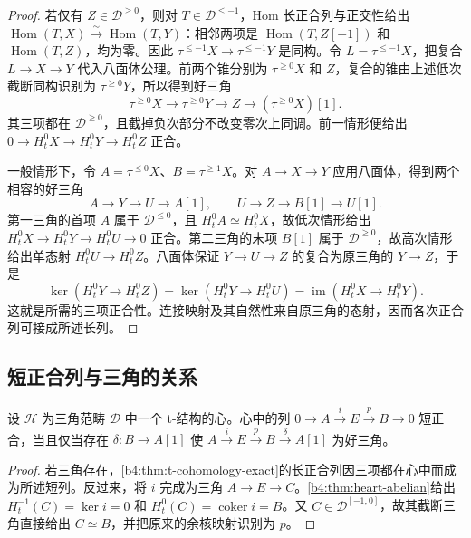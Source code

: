 \begin{proof}
	若仅有 \(Z\in\mathcal D^{\ge0}\)，则对 \(T\in\mathcal D^{\le-1}\)，Hom 长正合列与正交性给出 \(\operatorname{Hom}(T,X)\xrightarrow{\sim}\operatorname{Hom}(T,Y)\)：相邻两项是 \(\operatorname{Hom}(T,Z[-1])\) 和 \(\operatorname{Hom}(T,Z)\)，均为零。因此 \(\tau^{\le-1}X\to\tau^{\le-1}Y\) 是同构。令 \(L=\tau^{\le-1}X\)，把复合 \(L\to X\to Y\) 代入八面体公理。前两个锥分别为 \(\tau^{\ge0}X\) 和 \(Z\)，复合的锥由上述低次截断同构识别为 \(\tau^{\ge0}Y\)，所以得到好三角
	\[
		\tau^{\ge0}X\longrightarrow\tau^{\ge0}Y \longrightarrow Z\longrightarrow(\tau^{\ge0}X)[1].
	\]
	其三项都在 \(\mathcal D^{\ge0}\)，且截掉负次部分不改变零次上同调。前一情形便给出 \(0\to H_t^0X\to H_t^0Y\to H_t^0Z\) 正合。

	一般情形下，令 \(A=\tau^{\le0}X\)、\(B=\tau^{\ge1}X\)。对 \(A\to X\to Y\) 应用八面体，得到两个相容的好三角
	\[
		A\longrightarrow Y\longrightarrow U\longrightarrow A[1], \qquad U\longrightarrow Z\longrightarrow B[1]\longrightarrow U[1].
	\]
	第一三角的首项 \(A\) 属于 \(\mathcal D^{\le0}\)，且 \(H_t^0A\simeq H_t^0X\)，故低次情形给出 \(H_t^0X\to H_t^0Y\to H_t^0U\to0\) 正合。第二三角的末项 \(B[1]\) 属于 \(\mathcal D^{\ge0}\)，故高次情形给出单态射 \(H_t^0U\to H_t^0Z\)。八面体保证 \(Y\to U\to Z\) 的复合为原三角的 \(Y\to Z\)，于是
	\[
		\ker(H_t^0Y\longrightarrow H_t^0Z) =\ker(H_t^0Y\longrightarrow H_t^0U) =\operatorname{im}(H_t^0X\longrightarrow H_t^0Y).
	\]
	这就是所需的三项正合性。连接映射及其自然性来自原三角的态射，因而各次正合列可接成所述长列。
\end{proof}

\subsection{短正合列与三角的关系}
\label{b4:subsec:1903:02}

\begin{proposition}\label{b4:prop:heart-exact-triangles}
	设 \(\mathcal H\) 为三角范畴 \(\mathcal D\) 中一个 t-结构的心。心中的列 \(0\to A\xrightarrow{i}E\xrightarrow{p}B\to0\) 短正合，当且仅当存在 \(\delta:B\to A[1]\) 使 \(A\xrightarrow{i}E\xrightarrow{p}B\xrightarrow{\delta}A[1]\) 为好三角。
\end{proposition}
\begin{proof}
	若三角存在，\cref{b4:thm:t-cohomology-exact}的长正合列因三项都在心中而成为所述短列。反过来，将 \(i\) 完成为三角 \(A\to E\to C\)。\cref{b4:thm:heart-abelian}给出 \(H_t^{-1}(C)=\ker i=0\) 和 \(H_t^0(C)=\operatorname{coker}i=B\)。又 \(C\in\mathcal D^{[-1,0]}\)，故其截断三角直接给出 \(C\simeq B\)，并把原来的余核映射识别为 \(p\)。
\end{proof}

